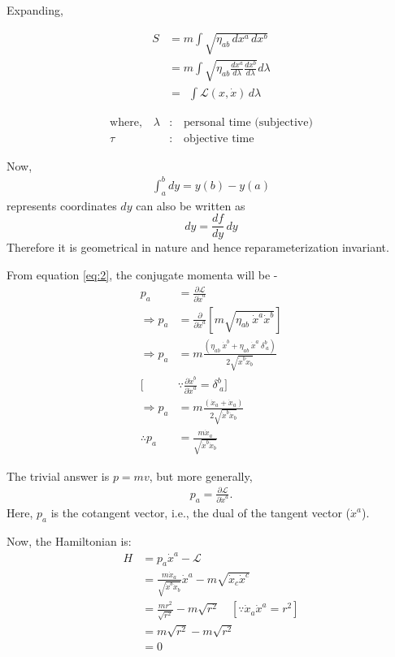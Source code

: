 \documentclass[14pt]{article} %
\begin{document}
Expanding,\\
\begin{minipage}[c]{0.5\textwidth}
\begin{align*}
    S &= m \int \sqrt{\eta_{ab} \, dx^a \, dx^b} \\
      &= m \int \sqrt{\eta_{ab} \frac{dx^a}{d\lambda} \frac{dx^b}{d\lambda}} d\lambda \\
      &= ~~\int \mathcal{L}(x, \dot{x}) \, d\lambda \tag{2} \label{eq:2}
\end{align*}
\end{minipage}
\hfill
\begin{minipage}[c]{0.45\textwidth}
\begin{align*}
    \text{where,}\quad \lambda & : \quad \text{personal time (subjective)} \\
    \tau & : \quad \text{objective time}
\end{align*}
\end{minipage}
Now, 
\begin{align*}
\int_a^b dy = y(b) - y(a)
\end{align*}
represents coordinates $dy$ can also be written as $$dy = \frac{df}{dy} \, dy$$
Therefore it is geometrical in nature and hence reparameterization invariant.

From equation \eqref{eq:2}, the conjugate momenta will be -
\begin{align*}
    p_a &= \frac{\partial \mathcal{L}}{\partial \dot{x}^a} \tag{3} \label{eq:3} \\
    \Rightarrow p_a &= \frac{\partial}{\partial \dot{x}^a} \left[ m \sqrt{\eta_{ab} ~\dot{x}^a \dot{x}^b} \right] \\
    \Rightarrow p_a &= m\frac{\left( \eta_{ab}~ \dot{x}^b + \eta_{ab}~ \dot{x}^a~ \delta^b_{~a} \right)}{2 \sqrt{\dot{x}^b \dot{x}_b}} \\
    [&\because \frac{\partial \dot{x}^b}{\partial \dot{x}^a} = \delta^b_{~a}] \\
     \Rightarrow p_a &= m\frac{\left(\dot{x}_a + \dot{x}_a\right)}{2 \sqrt{\dot{x}^b \dot{x}_b}} \\
    \therefore p_a &= \frac{m\dot{x}_a}{\sqrt{\dot{x}^b \dot{x}_b}} \tag{4} \label{eq:4}
\end{align*}
\begin{tcolorbox}[ title=\textbf{Note: How are $p$ and $v$ related?}]
The trivial answer is $p = mv$, but more generally,
\begin{align*}
p_a = \frac{\partial \mathcal{L}}{\partial \dot{x}^a}.
\end{align*}
Here, $p_a$ is the cotangent vector, i.e., the dual of the tangent vector ($\dot{x}^a$).
\end{tcolorbox}
Now, the Hamiltonian is:
\begin{align*}
    H &= p_a \dot{x}^a - \mathcal{L} \\
      &= \frac{m\dot{x}_a}{\sqrt{\dot{x}^b \dot{x}_b}} \dot{x}^a - m \sqrt{\dot{x}_c \dot{x}^c} \\
      &= \frac{mr^2}{\sqrt{r^2}} - m \sqrt{r^2} \quad [\because \dot{x}_a \dot{x}^a=r^2]\\
      &= m\sqrt{r^2} - m \sqrt{r^2} \\
      &= 0
\end{align*}
\end{document}
